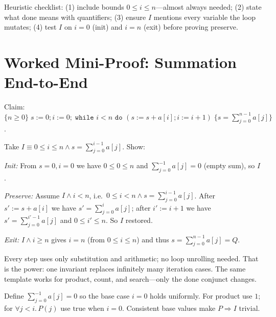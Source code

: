 Heuristic checklist: (1) include bounds $0\le i\le n$—almost always needed; (2) state what done means with quantifiers; (3) ensure $I$ mentions every variable the loop mutates; (4) test $I$ on $i=0$ (init) and $i=n$ (exit) before proving preserve.

\section{Worked Mini-Proof: Summation End-to-End}
\label{sec:mini-proof-sum}
Claim: $\{ n\ge0\}\; s:=0;i:=0;\;\texttt{while }i<n\texttt{ do }(s:=s+a[i];i:=i+1)\; \{s=\sum_{j=0}^{n-1}a[j]\}$.

Take $I\equiv 0\le i\le n\land s=\sum_{j=0}^{i-1}a[j]$. Show:

\textit{Init:} From $s=0,i=0$ we have $0\le0\le n$ and $\sum_{j=0}^{-1}a[j]=0$ (empty sum), so $I$.

\textit{Preserve:} Assume $I\land i<n$, i.e.\ $0\le i<n\land s=\sum_{j=0}^{i-1}a[j]$. After $s':=s+a[i]$ we have $s'=\sum_{j=0}^{i}a[j]$; after $i':=i+1$ we have $s'=\sum_{j=0}^{i'-1}a[j]$ and $0\le i'\le n$. So $I$ restored.

\textit{Exit:} $I\land i\ge n$ gives $i=n$ (from $0\le i\le n$) and thus $s=\sum_{j=0}^{n-1}a[j]=Q$.

Every step uses only substitution and arithmetic; no loop unrolling needed. That is the power: one invariant replaces infinitely many iteration cases. The same template works for product, count, and search—only the done conjunct changes.

\begin{remark}
Define $\sum_{j=0}^{-1}a[j]=0$ so the base case $i=0$ holds uniformly. For product use $1$; for $\forall j<i.\,P(j)$ use $\text{true}$ when $i=0$. Consistent base values make $P\Rightarrow I$ trivial.
\end{remark}

